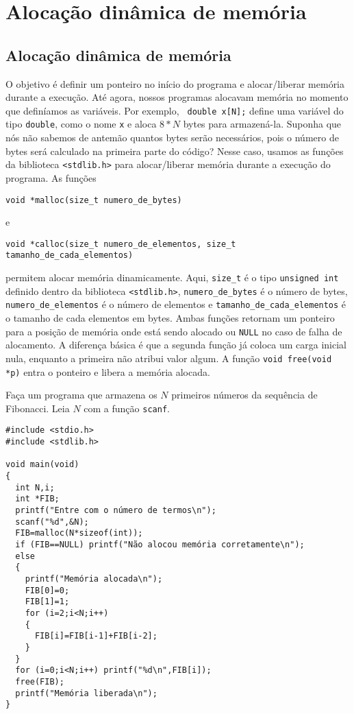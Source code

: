 
\chapter{Alocação dinâmica de memória}
\section{Alocação dinâmica de memória}
O objetivo é definir um ponteiro no início do programa e alocar/liberar memória durante a execução. Até agora, nossos programas alocavam memória no momento que definíamos as variáveis. Por exemplo, \verb| double x[N];| define uma variável do tipo \verb|double|, como o nome \verb|x| e aloca $8*N$ bytes para armazená-la. Suponha que nós não sabemos de antemão quantos bytes serão necessários, pois o número de bytes será calculado na primeira parte do código? Nesse caso, usamos as funções da biblioteca \verb|<stdlib.h>| para alocar/liberar memória durante a execução do programa. As funções
\begin{verbatim}
void *malloc(size_t numero_de_bytes)
\end{verbatim}
e
\begin{verbatim}
void *calloc(size_t numero_de_elementos, size_t tamanho_de_cada_elementos)
\end{verbatim}
permitem alocar memória dinamicamente. Aqui, \verb|size_t| é o tipo \verb|unsigned int| definido dentro da biblioteca \verb|<stdlib.h>|, \verb|numero_de_bytes| é o número de bytes, \verb|numero_de_elementos| é o número de elementos e \verb|tamanho_de_cada_elementos| é o tamanho de cada elementos em bytes. Ambas funções retornam um ponteiro para a posição de memória onde está sendo alocado ou \verb|NULL| no caso de falha de alocamento. A diferença básica é que a segunda função já coloca um carga inicial nula, enquanto a primeira não atribui valor algum. A função \verb|void free(void *p)| entra o ponteiro e libera a memória alocada.
\begin{ex}
Faça um programa que armazena os $N$ primeiros números da sequência de Fibonacci. Leia $N$ com a função \verb|scanf|.
\end{ex}
\begin{verbatim}
#include <stdio.h>
#include <stdlib.h>

void main(void)
{
  int N,i;
  int *FIB;
  printf("Entre com o número de termos\n");
  scanf("%d",&N);
  FIB=malloc(N*sizeof(int));
  if (FIB==NULL) printf("Não alocou memória corretamente\n");
  else
  {
    printf("Memória alocada\n");
    FIB[0]=0;
    FIB[1]=1;
    for (i=2;i<N;i++)
    {
      FIB[i]=FIB[i-1]+FIB[i-2];
    }
  }
  for (i=0;i<N;i++) printf("%d\n",FIB[i]);
  free(FIB);
  printf("Memória liberada\n");
}
\end{verbatim}

